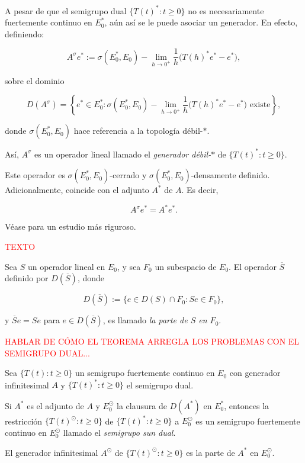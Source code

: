 \begin{Definicion}
    \label{ch:semigrupos:section:dual:def:genSgDual}

    A pesar de que el semigrupo dual $\{T(t)^* : t \geq 0\}$ no es necesariamente fuertemente continuo en $E_0^*$, aún así se le puede asociar un generador. En efecto, definiendo:

    \[A^\sigma e^* := \sigma(E_0^*, E_0)-\lim_{h \rightarrow 0^+} \frac{1}{h}\big(T(h)^*e^* - e^* \big),\]

    sobre el dominio

    \[D(A^\sigma) = \left \{e^* \in E_0^* : \sigma(E_0^*, E_0)-\lim_{h \rightarrow 0^+} \frac{1}{h}\big(T(h)^*e^* - e^* \big) \text{ existe} \right \},\]

    donde $\sigma(E_0^*, E_0)$ hace referencia a la topología débil-$*$.

    Así, $A^\sigma$ es un operador lineal llamado el \textit{generador débil-$*$} de $\{T(t)^* : t \geq 0\}$.

    Este operador es $\sigma(E_0^*, E_0)$-cerrado y $\sigma(E_0^*, E_0)$-densamente definido. Adicionalmente, coincide con el adjunto $A^*$ de $A$. Es decir,

    \[A^\sigma e^* = A^*e^*.\]

    Véase \cite[Par.~II.2.5]{engel-2006-sho-cou-ope} para un estudio más riguroso.
\end{Definicion}

\textcolor{red}{TEXTO}\\

\begin{Definicion}
    \label{ch:semigrupos:section:dual:def:parteDeSubesp}

    Sea $S$ un operador lineal en $E_0$, y sea $F_0$ un subespacio de $E_0$. El operador $\overline{S}$ definido por $D(\overline{S})$, donde

    \[D(\overline{S}) := \{e \in D(S) \cap F_0 : Se \in F_0\},\]

    y $\overline{S}e = Se$ para $e \in D(\overline{S})$, es llamado \textit{la parte de $S$ en $F_0$}. 
\end{Definicion}

\textcolor{red}{HABLAR DE CÓMO EL TEOREMA ARREGLA LOS PROBLEMAS CON EL SEMIGRUPO DUAL...}\\

\begin{Teorema}
    \label{ch:semigrupos:section:dual:th:SunDual}

    Sea $\{T(t) : t \geq 0 \}$ un semigrupo fuertemente continuo en $E_0$ con generador infinitesimal $A$ y $\{T(t)^* : t \geq 0 \}$ el semigrupo dual.

    Si $A^*$ es el adjunto de $A$ y $E_0^{\odot}$ la clausura de $D(A^*)$ en $E^*_0$, entonces la restricción $\{T(t)^\odot : t \geq 0\}$ de $\{T(t)^* : t \geq 0\}$ a $E_0^\odot$ es un semigrupo fuertemente continuo en $E_0^\odot$ llamado el \textit{semigrupo sun dual}.

    El generador infinitesimal $A^\odot$ de $\{T(t)^\odot : t \geq 0\}$ es la parte de $A^*$ en $E_0^\odot$.
\end{Teorema}

